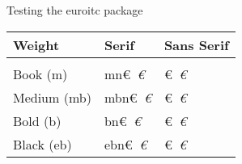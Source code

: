 \documentclass{article}
\newcommand{\showeuro}[2]{#1 ({\ttfamily#2}) &
   \usefont{U}{euroitc} {#2}{n}\euro\ \textit{\euro} &
   \usefont{U}{euroitcs}{#2}{n}\euro\ \textit{\euro} \\}
\begin{document}
\centering
{\LARGE Testing the {\ttfamily euroitc} package\par}

\bigskip
\begin{tabular}{lll}
   Weight & Serif & Sans Serif\\
 \hline\\[-1em]
   \showeuro{Book}  {m}
   \showeuro{Medium}{mb}
   \showeuro{Bold}  {b}
   \showeuro{Black} {eb}
\end{tabular}
\end{document}
